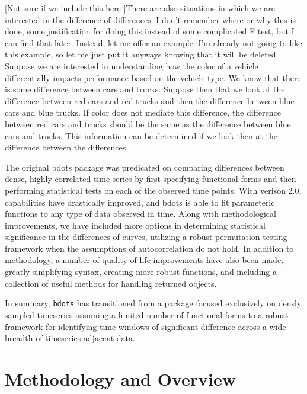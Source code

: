 \documentclass{article}
\begin{document}
[Not sure if we include this here ]There are also situations in which we are interested in the difference of differences. I don't remember where or why this is done, some justification for doing this instead of some complicated F test, but I can find that later. Instead, let me offer an example. I'm already not going to like this example, so let me just put it anyways knowing that it will be deleted. Suppose we are interested in understanding how the color of a vehicle differentially impacts performance based on the vehicle type. We know that there is some difference between cars and trucks. Suppose then that we look at the difference between red cars and red trucks and then the difference between blue cars and blue trucks. If color does not mediate this difference, the difference between red cars and trucks should be the same as the difference between blue cars and trucks. This information can be determined if we look then at the difference between the differences. 

The original bdots package was predicated on comparing differences between dense, highly correlated time series by first specifying functional forms and then performing statistical tests on each of the observed time points. With verison 2.0, capabilities have drastically improved, and bdots is able to fit parameteric functions to any type of data observed in time. Along with methodological improvements, we have included more options in determining statistical significance in the differences of curves, utilizing a robust permutation testing framework when the assumptions of autocorrelation do not hold. In addition to methodology, a number of quality-of-life improvements have also been made, greatly simplifying syntax, creating more robust functions, and including a collection of useful methods for handling returned objects.

In summary, \texttt{bdots} has transitioned from a package focused exclusively on densly sampled timeseries assuming a limited number of functional forms to a robust framework for identifying time windows of significant difference across a wide breadth of timeseries-adjacent data. 


\section{Methodology and Overview} 
\end{document}
